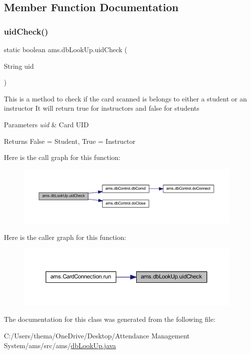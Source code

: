 \subsection{Member Function Documentation}
\mbox{\label{classams_1_1db_look_up_ac09044c1aea786643ccaf67188c61ca3}} 
\subsubsection{\texorpdfstring{uidCheck()}{uidCheck()}}
{\footnotesize\ttfamily static boolean ams.\+db\+Look\+Up.\+uid\+Check (\begin{DoxyParamCaption}\item[{String}]{uid }\end{DoxyParamCaption})\hspace{0.3cm}{\ttfamily [static]}}

This is a method to check if the card scanned is belongs to either a student or an instructor It will return true for instructors and false for students


\begin{DoxyParams}{Parameters}
{\em uid} & Card U\+ID \\
\hline
\end{DoxyParams}
\begin{DoxyReturn}{Returns}
False = Student, True = Instructor 
\end{DoxyReturn}
Here is the call graph for this function\+:\nopagebreak
\begin{figure}[H]
\begin{center}
\leavevmode
\includegraphics[width=350pt]{classams_1_1db_look_up_ac09044c1aea786643ccaf67188c61ca3_cgraph}
\end{center}
\end{figure}
Here is the caller graph for this function\+:\nopagebreak
\begin{figure}[H]
\begin{center}
\leavevmode
\includegraphics[width=350pt]{classams_1_1db_look_up_ac09044c1aea786643ccaf67188c61ca3_icgraph}
\end{center}
\end{figure}


The documentation for this class was generated from the following file\+:\begin{DoxyCompactItemize}
\item 
C\+:/\+Users/thema/\+One\+Drive/\+Desktop/\+Attendance Management System/ams/src/ams/\mbox{\hyperlink{db_look_up_8java}{db\+Look\+Up.\+java}}\end{DoxyCompactItemize}
